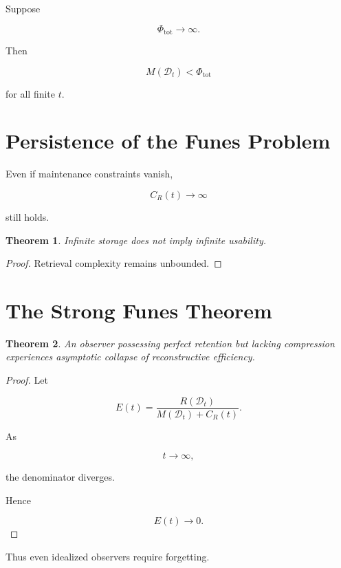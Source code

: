 \documentclass[12pt,oneside]{book}
\theoremstyle{plain} \newtheorem{theorem}{Theorem}[chapter] \newtheorem{lemma}[theorem]{Lemma} \newtheorem{proposition}[theorem]{Proposition} \newtheorem{corollary}[theorem]{Corollary}
\theoremstyle{definition} \newtheorem{definition}[theorem]{Definition} \newtheorem{axiom}[theorem]{Axiom} \newtheorem{construction}[theorem]{Construction}
\theoremstyle{remark} \newtheorem{remark}[theorem]{Remark} \newtheorem{example}[theorem]{Example}
\newcommand{\D}{\mathcal{D}} \newcommand{\R}{\mathcal{R}} \newcommand{\F}{\mathcal{F}} \newcommand{\U}{\mathcal{U}} \newcommand{\M}{\mathcal{M}} \newcommand{\G}{\Gamma}
\begin{document}
Suppose

\[
\Phi_{\mathrm{tot}}
\rightarrow
\infty.
\]

Then

\[
M(\D_t)
<
\Phi_{\mathrm{tot}}
\]

for all finite $t$.

\section{Persistence of the Funes Problem}

Even if maintenance constraints vanish,

\[
C_R(t)
\rightarrow
\infty
\]

still holds.

\begin{theorem}

Infinite storage does not imply infinite usability.

\end{theorem}

\begin{proof}

Retrieval complexity remains unbounded.

\end{proof}

\section{The Strong Funes Theorem}

\begin{theorem}

An observer possessing perfect retention but lacking compression experiences asymptotic collapse of reconstructive efficiency.

\end{theorem}

\begin{proof}

Let

\[
E(t)
=
\frac{R(\D_t)}
{M(\D_t)+C_R(t)}.
\]

As

\[
t\rightarrow\infty,
\]

the denominator diverges.

Hence

\[
E(t)\rightarrow 0.
\]

\end{proof}

Thus even idealized observers require forgetting.
\end{document}
